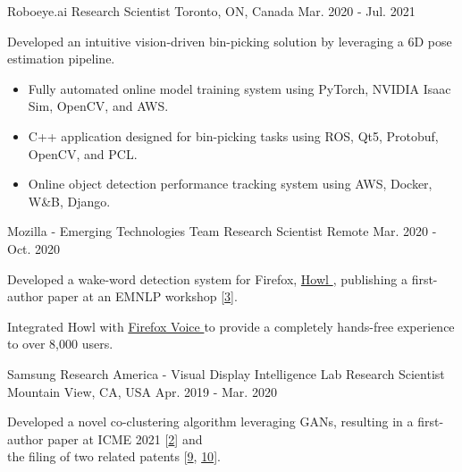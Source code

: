 \begin{cventries}
{}
\cventry
{Roboeye.ai} %
{Research Scientist} %
{Toronto, ON, Canada} %
{Mar. 2020 - Jul. 2021} %
{ %
\begin{cvitems}
\item {Developed an intuitive vision-driven bin-picking solution by leveraging a 6D pose estimation pipeline.}
\begin{itemize}[label=$\cdot$,leftmargin=0.7em]
\item {Fully automated online model training system using PyTorch, NVIDIA Isaac Sim, OpenCV, and AWS.}
\item {C++ application designed for bin-picking tasks using ROS, Qt5, Protobuf, OpenCV, and PCL.}
\item {Online object detection performance tracking system using AWS, Docker, W\&B, Django.}
\end{itemize}
\end{cvitems}
}
\cventry
{Mozilla - Emerging Technologies Team} %
{Research Scientist} %
{Remote} %
{Mar. 2020 - Oct. 2020} %
{ %
\begin{cvitems}
\item {Developed a wake-word detection system for Firefox, \href{https://github.com/castorini/howl}{Howl {\small \faGithub}}, publishing a first-author paper at an EMNLP workshop [\hyperlink{howl:EMNLP}{3}].}
\item {Integrated Howl with \href{https://github.com/mozilla-extensions/firefox-voice}{Firefox Voice {\small \faGithub}} to provide a completely hands-free experience to over 8,000 users.}
\end{cvitems}
}
\cventry
{Samsung Research America - Visual Display Intelligence Lab} %
{Research Scientist} %
{Mountain View, CA, USA} %
{Apr. 2019 - Mar. 2020} %
{ %
\begin{cvitems}
\item {Developed a novel co-clustering algorithm leveraging GANs, resulting in a first-author paper at ICME 2021 [\hyperlink{CI-GAN:ICME}{2}] and \\the filing of two related patents [\hyperlink{CI-GAN:International}{9}, \hyperlink{CI-GAN:US}{10}].}
\begin{itemize}[label=$\cdot$,leftmargin=0.7em]

\end{itemize}
\end{cvitems}}
\end{cventries}
